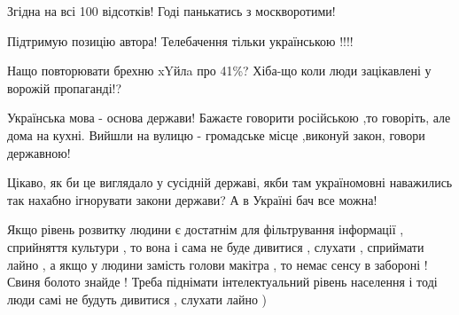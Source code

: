 \begin{itemize}
 
Згідна на всі 100 відсотків! Годі панькатись з москворотими!

 
Підтримую позицію автора! Телебачення тільки українською !!!!

 
Нащо повторювати брехню xYйлa про 41\%? Хіба-що коли люди зацікавлені у ворожій пропаганді!?

 

Українська мова - основа держави! Бажаєте говорити російською ,то говоріть, але
дома на кухні. Вийшли на вулицю - громадське місце ,виконуй закон, говори
державною!

Цікаво, як би це виглядало у сусідній державі, якби там україномовні наважились
так нахабно ігнорувати закони держави? А в Україні бач все можна!


 

Якщо рівень розвитку людини є достатнім для фільтрування інформації ,
сприйняття культури , то вона і сама не буде дивитися , слухати , сприймати
лайно , а якщо у людини замість голови макітра , то немає сенсу в забороні !
Свиня болото знайде ! Треба піднімати інтелектуальний рівень населення і тоді
люди самі не будуть дивитися , слухати лайно )


\end{itemize}
